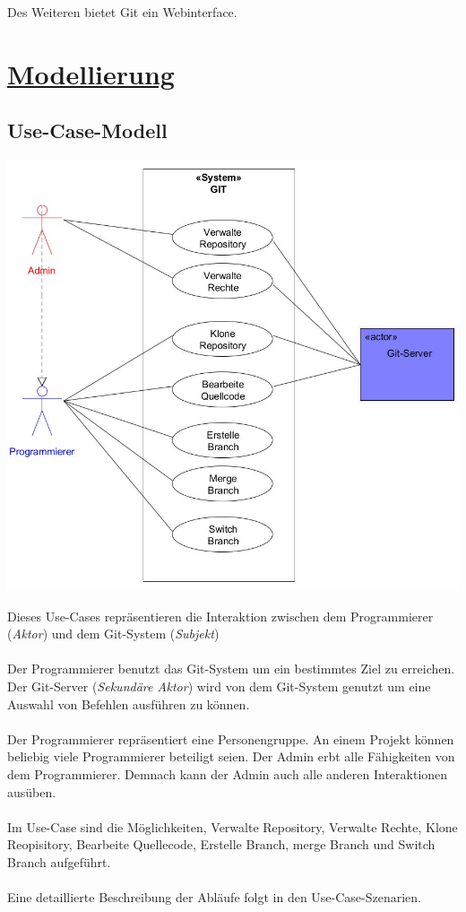 \documentclass[a4paper]{article}
\begin{document}
Des Weiteren bietet Git ein Webinterface.

\section{\underline{Modellierung}}

\subsection{Use-Case-Modell}

\includegraphics[width=\textwidth]{Use-Case-Modell.png}	

Dieses Use-Cases repräsentieren die Interaktion zwischen dem Programmierer (\textit{Aktor}) und dem Git-System (\textit{Subjekt})\\  							%
\\ 														%
Der Programmierer benutzt das Git-System um ein bestimmtes Ziel zu erreichen. 
Der Git-Server (\textit{Sekundäre Aktor}) wird von dem Git-System genutzt um eine Auswahl von Befehlen ausführen zu können.\\
\\
Der Programmierer repräsentiert eine Personengruppe. An einem Projekt können beliebig viele Programmierer beteiligt seien.  
Der Admin erbt alle Fähigkeiten von dem Programmierer. Demnach kann der Admin auch alle anderen Interaktionen ausüben.  \\
\\
Im Use-Case sind die Möglichkeiten, Verwalte \gls{Repository}, Verwalte Rechte, \gls{Klone} Reopisitory, Bearbeite Quellecode, Erstelle \gls{Branch}, \gls{merge} Branch und \gls{Switch} Branch aufgeführt. \\
\\
Eine detaillierte Beschreibung der Abläufe folgt in den Use-Case-Szenarien. 
\end{document}
